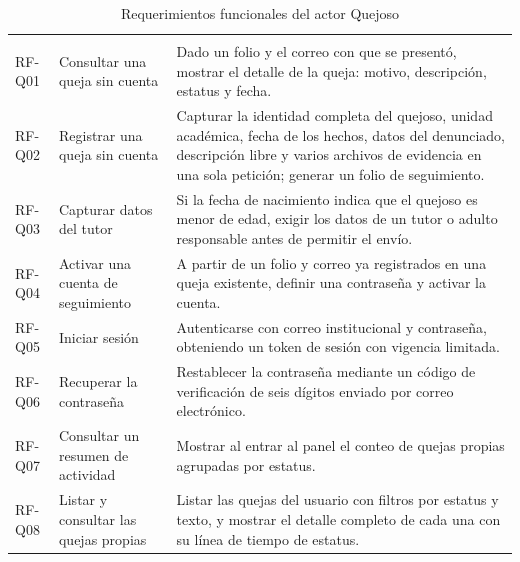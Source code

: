 	\begin{longtable}{|p{1.5cm}|p{3.6cm}|p{9.0cm}|}
		\caption{Requerimientos funcionales del actor Quejoso}
		\label{tab:rf_quejoso} \\
		\hline
		\rowcolor{headerblue}
		\headercell{ID} & \headercell{Requerimiento} & \headercell{Descripción} \\
		\hline
		\endfirsthead
	
		\hline
		\rowcolor{headerblue}
		\headercell{ID} & \headercell{Requerimiento} & \headercell{Descripción} \\
		\hline
		\endhead
	
		RF-Q01 & Consultar una queja sin cuenta & Dado un folio y el correo con que se presentó,
		mostrar el detalle de la queja: motivo, descripción, estatus y fecha. \\ \hline
	
		RF-Q02 & Registrar una queja sin cuenta & Capturar la identidad completa del quejoso,
		unidad académica, fecha de los hechos, datos del denunciado, descripción libre y varios
		archivos de evidencia en una sola petición; generar un folio de seguimiento. \\ \hline
	
		RF-Q03 & Capturar datos del tutor & Si la fecha de nacimiento indica que el quejoso es menor
		de edad, exigir los datos de un tutor o adulto responsable antes de permitir el envío.
		\\ \hline
	
		RF-Q04 & Activar una cuenta de seguimiento & A partir de un folio y correo ya registrados en
		una queja existente, definir una contraseña y activar la cuenta. \\ \hline
	
		RF-Q05 & Iniciar sesión & Autenticarse con correo institucional y contraseña, obteniendo un
		token de sesión con vigencia limitada. \\ \hline
	
		RF-Q06 & Recuperar la contraseña & Restablecer la contraseña mediante un código de
		verificación de seis dígitos enviado por correo electrónico. \\ \hline
	
		RF-Q07 & Consultar un resumen de actividad & Mostrar al entrar al panel el conteo de quejas
		propias agrupadas por estatus. \\ \hline
	
		RF-Q08 & Listar y consultar las quejas propias & Listar las quejas del usuario con filtros
		por estatus y texto, y mostrar el detalle completo de cada una con su línea de tiempo de
		estatus. \\ \hline
	

\end{longtable}
